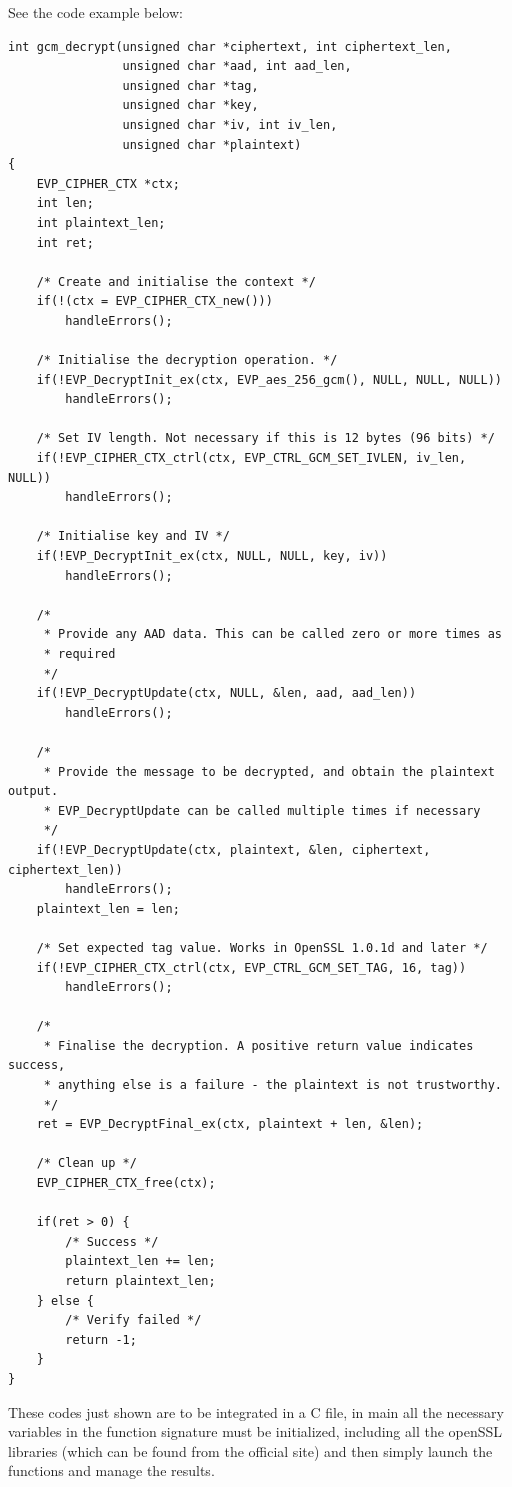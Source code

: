 \documentclass{article}
\begin{document}
See the code example below:
\begin{lstlisting}
int gcm_decrypt(unsigned char *ciphertext, int ciphertext_len,
                unsigned char *aad, int aad_len,
                unsigned char *tag,
                unsigned char *key,
                unsigned char *iv, int iv_len,
                unsigned char *plaintext)
{
    EVP_CIPHER_CTX *ctx;
    int len;
    int plaintext_len;
    int ret;

    /* Create and initialise the context */
    if(!(ctx = EVP_CIPHER_CTX_new()))
        handleErrors();

    /* Initialise the decryption operation. */
    if(!EVP_DecryptInit_ex(ctx, EVP_aes_256_gcm(), NULL, NULL, NULL))
        handleErrors();

    /* Set IV length. Not necessary if this is 12 bytes (96 bits) */
    if(!EVP_CIPHER_CTX_ctrl(ctx, EVP_CTRL_GCM_SET_IVLEN, iv_len, NULL))
        handleErrors();

    /* Initialise key and IV */
    if(!EVP_DecryptInit_ex(ctx, NULL, NULL, key, iv))
        handleErrors();

    /*
     * Provide any AAD data. This can be called zero or more times as
     * required
     */
    if(!EVP_DecryptUpdate(ctx, NULL, &len, aad, aad_len))
        handleErrors();

    /*
     * Provide the message to be decrypted, and obtain the plaintext output.
     * EVP_DecryptUpdate can be called multiple times if necessary
     */
    if(!EVP_DecryptUpdate(ctx, plaintext, &len, ciphertext, ciphertext_len))
        handleErrors();
    plaintext_len = len;

    /* Set expected tag value. Works in OpenSSL 1.0.1d and later */
    if(!EVP_CIPHER_CTX_ctrl(ctx, EVP_CTRL_GCM_SET_TAG, 16, tag))
        handleErrors();

    /*
     * Finalise the decryption. A positive return value indicates success,
     * anything else is a failure - the plaintext is not trustworthy.
     */
    ret = EVP_DecryptFinal_ex(ctx, plaintext + len, &len);

    /* Clean up */
    EVP_CIPHER_CTX_free(ctx);

    if(ret > 0) {
        /* Success */
        plaintext_len += len;
        return plaintext_len;
    } else {
        /* Verify failed */
        return -1;
    }
}
\end{lstlisting}
These codes just shown are to be integrated in a C file, in main all the necessary variables in the function signature must be initialized, including all the openSSL libraries (which can be found from the official site) and then simply launch the functions and manage the results.
\end{document}
